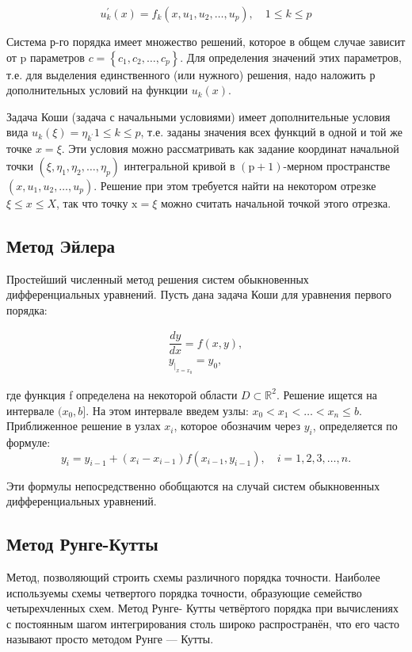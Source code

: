 \documentclass[a4paper,12pt]{article}
\begin{document}
$$
u_{k}^{\prime}(x)=f_{k}\left(x, u_{1}, u_{2}, \ldots, u_{p}\right), \quad 1 \leq k \leq p
$$

Система р-го порядка имеет множество решений, которое в общем случае зависит от $\mathrm{p}$ параметров $c=\left\{c_{1}, c_{2}, \ldots, c_{p}\right\}$. Для определения значений этих параметров, т.е. для выделения единственного (или нужного) решения, надо наложить р дополнительных условий на функции $u_{k}(x)$.

Задача Коши (задача с начальными условиями) имеет дополнительные условия вида $u_{k}(\xi)=\eta_{k^{\prime}} 1 \leq k \leq p$, т.е. заданы значения всех функций в одной и той же точке $x=\xi .$ Эти условия можно рассматривать как задание координат начальной точки $\left(\xi, \eta_{1}, \eta_{2}, \ldots, \eta_{p}\right)$ интегральной кривой в $(\mathrm{p}+1)$-мерном пространстве $\left(x, u_{1}, u_{2}, \ldots, u_{p}\right) .$ Решение при этом требуется найти на некотором отрезке $\xi \leq x \leq X$, так что точку $\mathrm{x}=\xi$ можно считать начальной точкой этого отрезка.

\subsection{Метод Эйлера}
 Простейший численный метод решения систем обыкновенных дифференциальных уравнений.
 Пусть дана задача Коши для уравнения первого порядка:
 
$$\begin{aligned}
 \dfrac{dy}{dx}=f(x,y),\\
 y_{{|_{{x=x_{0}}}}}=y_{0},\end{aligned} $$
 
 где функция f определена на некоторой области  $ D\subset \mathbb{R} ^{2} $. Решение ищется на интервале $ (x_{0},b] $. На этом интервале введем узлы: $ x_{0}<x_{1}<\dots <x_{n}\leq b $. Приближенное решение в узлах $ x_{i} $, которое обозначим через $ y_{i} $, определяется по формуле:
 $$ y_{i}=y_{{i-1}}+(x_{i}-x_{{i-1}})f(x_{{i-1}},y_{{i-1}}),\quad i=1,2,3,\dots ,n. $$
 
 Эти формулы непосредственно обобщаются на случай систем обыкновенных дифференциальных уравнений.

\subsection{Метод Рунге-Кутты}

Метод, позволяющий строить схемы различного порядка точности. Наиболее используемы схемы четвертого порядка точности, образующие семейство четырехчленных схем. Метод Рунге- Кутты четвёртого порядка при вычислениях с постоянным шагом интегрирования столь широко распространён, что его часто называют просто методом Рунге — Кутты.
\end{document}
